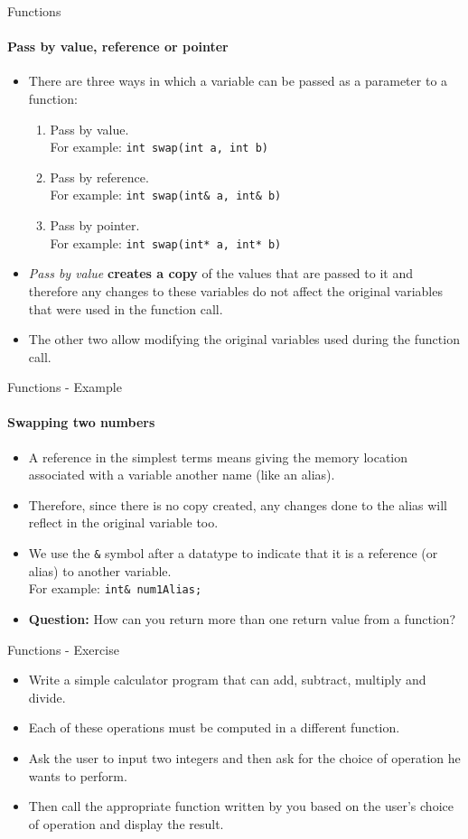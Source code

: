 \documentclass[aspectratio=169]{beamer}
\begin{document}
\begin{frame}[fragile]{Functions}
	\framesubtitle{Pass by value, reference or pointer}
	\begin{itemize}
		\item There are three ways in which a variable can be passed as a parameter to a function: 
		\begin{enumerate}
			\item Pass by value. \\For example: \verb|int swap(int a, int b)|
			\item Pass by reference. \\For example: \verb|int swap(int& a, int& b)|
			\item Pass by pointer. \\For example: \verb|int swap(int* a, int* b)|
		\end{enumerate}
		\item \textit{Pass by value} \textbf{creates a copy} of the values that are passed to it and therefore any changes to these variables do not affect the original variables that were used in the function call.
		\item The other two allow modifying the original variables used during the function call.
	\end{itemize}
\end{frame}

\begin{frame}[fragile]{Functions - Example}
	\framesubtitle{Swapping two numbers}
	\begin{itemize}
		\item A reference in the simplest terms means giving the memory location associated with a variable another name (like an alias).
		\item Therefore, since there is no copy created, any changes done to the alias will reflect in the original variable too.
		\item We use the \verb|&| symbol after a datatype to indicate that it is a reference (or alias) to another variable. \\For example: \verb|int& num1Alias;|
		\item \textbf{Question:} How can you return more than one return value from a function?
	\end{itemize}
\end{frame}

\begin{frame}[fragile]{Functions - Exercise}
	\begin{itemize}
		\item Write a simple calculator program that can add, subtract, multiply and divide.
		\item Each of these operations must be computed in a different function.
		\item Ask the user to input two integers and then ask for the choice of operation he wants to perform.
		\item Then call the appropriate function written by you based on the user's choice of operation and display the result.
	\end{itemize}
\end{frame}
\end{document}
